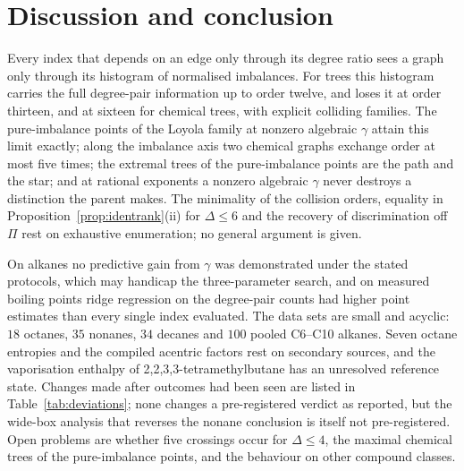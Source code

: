 \documentclass[a5paper, 10pt]{article}
\theoremstyle{plain}
\theoremstyle{remark}
\theoremstyle{definition}
\begin{document}
\section{Discussion and conclusion}\label{sec:conclusion}

Every index that depends on an edge only through its degree ratio sees a
graph only through its histogram of normalised imbalances. For trees this
histogram carries the full degree-pair information up to order twelve,
and loses it at order thirteen, and at sixteen for chemical trees, with
explicit colliding families. The pure-imbalance points of the Loyola
family at nonzero algebraic $\gamma$ attain this limit exactly; along the
imbalance axis two chemical graphs exchange order at most five times; the
extremal trees of the pure-imbalance points are the path and the star;
and at rational exponents a nonzero algebraic $\gamma$ never destroys a
distinction the parent makes. The minimality of the collision orders,
equality in Proposition~\ref{prop:identrank}(ii) for $\Delta \le 6$ and
the recovery of discrimination off $\Pi$ rest on exhaustive enumeration;
no general argument is given.

On alkanes no predictive gain from $\gamma$ was demonstrated under the
stated protocols, which may handicap the three-parameter search, and on
measured boiling points ridge regression on the degree-pair counts
had higher point estimates than every single index evaluated. The data sets are
small and acyclic: $18$ octanes, $35$ nonanes, $34$ decanes and $100$
pooled C6--C10 alkanes. Seven octane entropies and the compiled acentric
factors rest on secondary sources, and the vaporisation enthalpy of
2,2,3,3-tetramethylbutane has an unresolved reference state. Changes made after outcomes had been seen are
listed in Table~\ref{tab:deviations}; none changes a pre-registered
verdict as reported, but the wide-box analysis that reverses the nonane
conclusion is itself not pre-registered. Open problems are whether five
crossings occur for $\Delta \le 4$, the maximal chemical trees of the
pure-imbalance points, and the behaviour on other compound classes.
\end{document}
